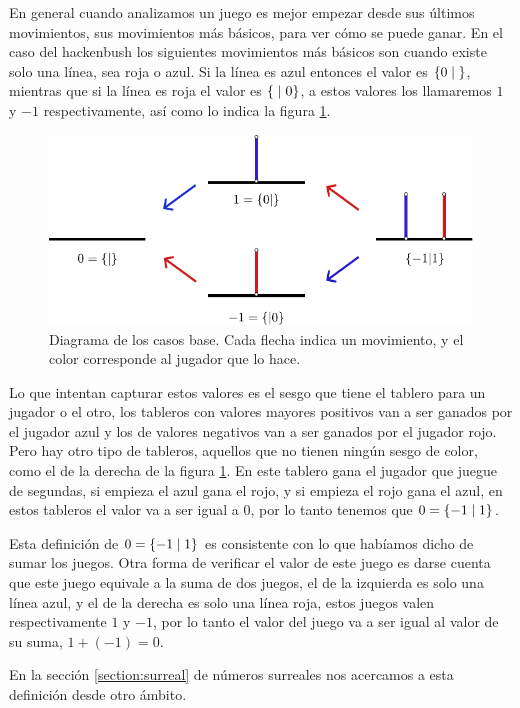 En general cuando analizamos un juego es mejor empezar desde sus \'ultimos movimientos, sus movimientos m\'as b\'asicos, para ver c\'omo se puede ganar. En el caso del hackenbush los siguientes movimientos m\'as b\'asicos son cuando existe solo una l\'inea, sea roja o azul. Si la l\'inea es azul entonces el valor es $\left\{0\;\middle|\; \right\}$, mientras que si la l\'inea es roja el valor es $\left\{\;\middle|\; 0\right\}$, a estos valores los llamaremos $1$ y $-1$ respectivamente, as\'i como lo indica la figura \ref{figure:hackenbush_roots}.

\begin{figure}[h]
    \centering
    \includegraphics[width=.7\textwidth]{images/hackenbush-surr_roots.pdf}
    \caption{Diagrama de los casos base. Cada flecha indica un movimiento, y el color corresponde al jugador que lo hace.}
    \label{figure:hackenbush_roots}
\end{figure}

Lo que intentan capturar estos valores es el sesgo que tiene el tablero para un jugador o el otro, los tableros con valores mayores positivos van a ser ganados por el jugador azul y los de valores negativos van a ser ganados por el jugador rojo. Pero hay otro tipo de tableros, aquellos que no tienen ning\'un sesgo de color, como el de la derecha de la figura \ref{figure:hackenbush_roots}. En este tablero gana el jugador que juegue de segundas, si empieza el azul gana el rojo, y si empieza el rojo gana el azul, en estos tableros el valor va a ser igual a $0$, por lo tanto tenemos que $0=\left\{-1\;\middle|\; 1\right\}$.

Esta definici\'on de $0=\left\{-1\;\middle|\; 1\right\}$ es consistente con lo que hab\'iamos dicho de sumar los juegos. Otra forma de verificar el valor de este juego es darse cuenta que este juego equivale a la suma de dos juegos, el de la izquierda es solo una l\'inea azul, y el de la derecha es solo una l\'inea roja, estos juegos valen respectivamente $1$ y $-1$, por lo tanto el valor del juego va a ser igual al valor de su suma, $1+(-1) = 0$.

En la secci\'on \ref{section:surreal} de n\'umeros surreales nos acercamos a esta definici\'on desde otro \'ambito.

